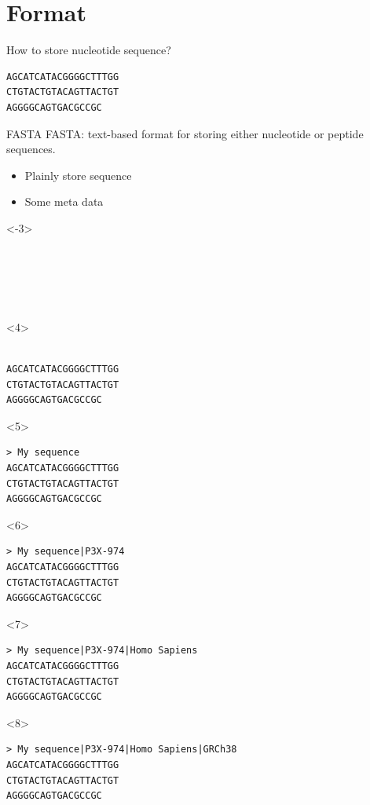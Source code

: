 \documentclass[usepdftitle=false]{beamer}
\begin{document}
\section{Format}

\begin{frame}[fragile]{How to store nucleotide sequence?}
	\pause
		\begin{verbatim}
AGCATCATACGGGGCTTTGG
CTGTACTGTACAGTTACTGT
AGGGGCAGTGACGCCGC
	\end{verbatim}
\end{frame}

\begin{frame}[fragile]{FASTA}
	FASTA: text-based format for storing either nucleotide or peptide sequences.
	\pause
	\begin{itemize}
		\item Plainly store sequence
		\pause
		\item Some meta data
	\end{itemize}
	\pause
	\begin{onlyenv}<-3>
		\begin{verbatim}
​
​
​
​
		\end{verbatim}
	\end{onlyenv}
	\begin{onlyenv}
		\begin{verbatim}
​
AGCATCATACGGGGCTTTGG
CTGTACTGTACAGTTACTGT
AGGGGCAGTGACGCCGC
		\end{verbatim}
	\end{onlyenv}
	\begin{onlyenv}
		\begin{verbatim}
> My sequence
AGCATCATACGGGGCTTTGG
CTGTACTGTACAGTTACTGT
AGGGGCAGTGACGCCGC
		\end{verbatim}
	\end{onlyenv}
	\begin{onlyenv}
		\begin{verbatim}
> My sequence|P3X-974
AGCATCATACGGGGCTTTGG
CTGTACTGTACAGTTACTGT
AGGGGCAGTGACGCCGC
		\end{verbatim}
	\end{onlyenv}
	\begin{onlyenv}
		\begin{verbatim}
> My sequence|P3X-974|Homo Sapiens
AGCATCATACGGGGCTTTGG
CTGTACTGTACAGTTACTGT
AGGGGCAGTGACGCCGC
		\end{verbatim}
	\end{onlyenv}
	\begin{onlyenv}
		\begin{verbatim}
> My sequence|P3X-974|Homo Sapiens|GRCh38
AGCATCATACGGGGCTTTGG
CTGTACTGTACAGTTACTGT
AGGGGCAGTGACGCCGC
		\end{verbatim}
	\end{onlyenv}
\end{frame}
\end{document}
